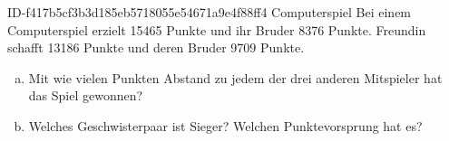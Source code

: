\begin{exercise}
      {ID-f417b5cf3b3d185eb5718055e54671a9e4f88ff4}
      {Computerspiel}
  \ifproblem\problem
    Bei einem Computerspiel erzielt \xxa{} \num{15465} Punkte und ihr Bruder \xyb{}
    \num{8376} Punkte.  Freundin \xxc{} schafft \num{13186} Punkte und deren Bruder
    \xyd{} \num{9709} Punkte.
    \begin{enumerate}[a)]
      \item Mit wie vielen Punkten Abstand zu jedem der drei anderen Mitspieler
            hat \xxa{} das Spiel gewonnen?
      \item Welches Geschwisterpaar ist Sieger? Welchen Punktevorsprung hat es?
    \end{enumerate}
  \fi
\end{exercise}
